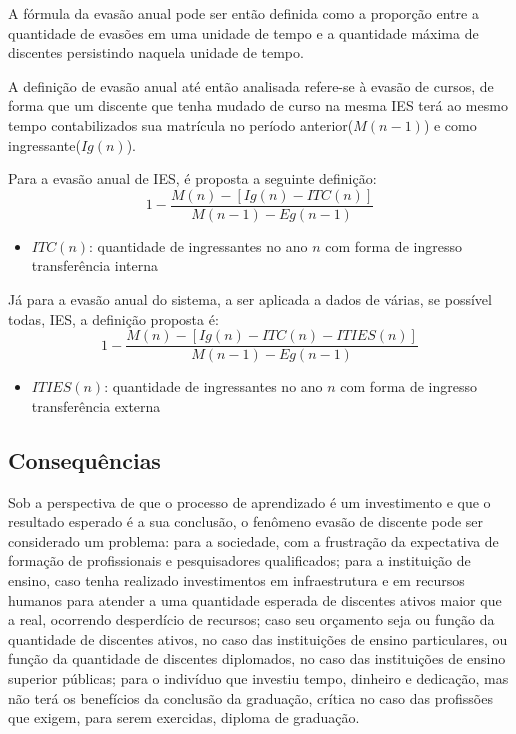 \documentclass{report}
\begin{document}
A fórmula da evasão anual pode ser então definida como a proporção entre a quantidade de evasões em uma unidade de tempo e a quantidade máxima de discentes persistindo naquela unidade de tempo.

A definição de evasão anual até então analisada refere-se à evasão de cursos, de forma que um discente que tenha mudado de curso na mesma IES terá ao mesmo tempo contabilizados sua matrícula no período anterior($M(n-1)$) e como ingressante($Ig(n)$).

Para a evasão anual de IES, é proposta a seguinte definição:
\begin{equation}
1 - \frac{M(n) - [Ig(n) - ITC(n)]}{M(n-1) - Eg(n-1)}
\end{equation}
\begin{itemize}
\item $ITC(n)$: quantidade de ingressantes no ano $n$ com forma de ingresso transferência interna
\end{itemize}

Já para a evasão anual do sistema, a ser aplicada a dados de várias, se possível todas, IES, a definição proposta é:
\begin{equation}
1 - \frac{M(n) - [Ig(n) - ITC(n) - ITIES(n)]}{M(n-1) - Eg(n-1)}
\end{equation}
\begin{itemize}
\item $ITIES(n)$: quantidade de ingressantes no ano $n$ com forma de ingresso transferência externa
\end{itemize}


\subsection{Consequências}

Sob a perspectiva de que o processo de aprendizado é um investimento e que o resultado esperado é a sua conclusão, o fenômeno evasão de discente pode ser considerado um problema: para a sociedade, com a frustração da expectativa de formação de profissionais e pesquisadores qualificados; para a instituição de ensino, caso tenha realizado investimentos em infraestrutura e em recursos humanos para atender a uma quantidade esperada de discentes ativos maior que a real, ocorrendo desperdício de recursos; caso seu orçamento seja ou função da quantidade de discentes ativos, no caso das instituições de ensino particulares, ou função da quantidade de discentes diplomados, no caso das instituições de ensino superior públicas; para o indivíduo que investiu tempo, dinheiro e dedicação, mas não terá os benefícios da conclusão da graduação, crítica no caso das profissões que exigem, para serem exercidas, diploma de graduação.
\end{document}
